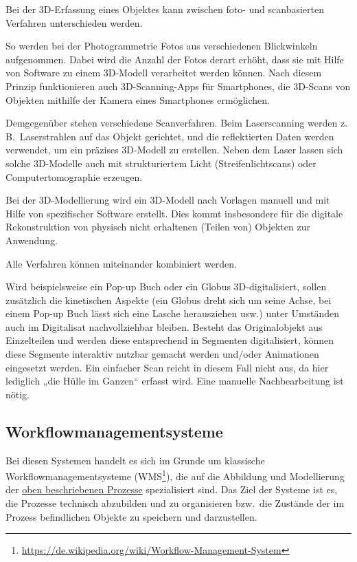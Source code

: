 \documentclass[
  11pt,
  letterpaper,
  DIV=11,
  twoside]{scrreprt}
\DeclareRobustCommand{\href}[2]{#2\footnote{\url{#1}}}
\begin{document}
Bei der 3D-Erfassung eines Objektes kann zwischen foto- und
scanbasierten Verfahren unterschieden werden.

So werden bei der Photogrammetrie Fotos aus verschiedenen Blickwinkeln
aufgenommen. Dabei wird die Anzahl der Fotos derart erhöht, dass sie mit
Hilfe von Software zu einem 3D-Modell verarbeitet werden können. Nach
diesem Prinzip funktionieren auch 3D-Scanning-Apps für Smartphones, die
3D-Scans von Objekten mithilfe der Kamera eines Smartphones ermöglichen.

Demgegenüber stehen verschiedene Scanverfahren. Beim Laserscanning
werden z.\,B.~Laserstrahlen auf das Objekt gerichtet, und die
reflektierten Daten werden verwendet, um ein präzises 3D-Modell zu
erstellen. Neben dem Laser lassen sich solche 3D-Modelle auch mit
strukturiertem Licht (Streifenlichtscans) oder Computertomographie
erzeugen.

Bei der 3D-Modellierung wird ein 3D-Modell nach Vorlagen manuell und mit
Hilfe von spezifischer Software erstellt. Dies kommt insbesondere für
die digitale Rekonstruktion von physisch nicht erhaltenen (Teilen von)
Objekten zur Anwendung.

Alle Verfahren können miteinander kombiniert werden.

Wird beispielsweise ein Pop-up Buch oder ein Globus 3D-digitalisiert,
sollen zusätzlich die kinetischen Aspekte (ein Globus dreht sich um
seine Achse, bei einem Pop-up Buch lässt sich eine Lasche herausziehen
usw.) unter Umständen auch im Digitalisat nachvollziehbar bleiben.
Besteht das Originalobjekt aus Einzelteilen und werden diese
entsprechend in Segmenten digitalisiert, können diese Segmente
interaktiv nutzbar gemacht werden und/oder Animationen eingesetzt
werden. Ein einfacher Scan reicht in diesem Fall nicht aus, da hier
lediglich „die Hülle im Ganzen`` erfasst wird. Eine manuelle
Nachbearbeitung ist nötig.

\subsection{Workflowmanagementsysteme}\label{workflowmanagementsysteme}

Bei diesen Systemen handelt es sich im Grunde um klassische
Workflowmanagementsysteme
(\href{https://de.wikipedia.org/wiki/Workflow-Management-System}{WMS}),
die auf die Abbildung und Modellierung der \hyperref[prozesse]{oben
beschriebenen Prozesse} spezialisiert sind. Das Ziel der Systeme ist es,
die Prozesse technisch abzubilden und zu organisieren bzw.~die Zustände
der im Prozess befindlichen Objekte zu speichern und darzustellen.
\end{document}
